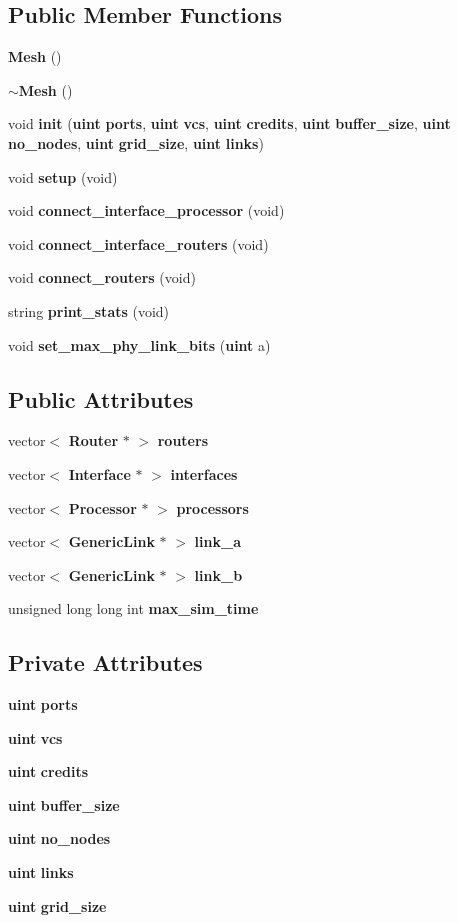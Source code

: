 \subsection*{Public Member Functions}
\begin{CompactItemize}
\item 
{\bf Mesh} ()
\item 
{\bf $\sim$Mesh} ()
\item 
void {\bf init} ({\bf uint} {\bf ports}, {\bf uint} {\bf vcs}, {\bf uint} {\bf credits}, {\bf uint} {\bf buffer\_\-size}, {\bf uint} {\bf no\_\-nodes}, {\bf uint} {\bf grid\_\-size}, {\bf uint} {\bf links})
\item 
void {\bf setup} (void)
\item 
void {\bf connect\_\-interface\_\-processor} (void)
\item 
void {\bf connect\_\-interface\_\-routers} (void)
\item 
void {\bf connect\_\-routers} (void)
\item 
string {\bf print\_\-stats} (void)
\item 
void {\bf set\_\-max\_\-phy\_\-link\_\-bits} ({\bf uint} a)
\end{CompactItemize}
\subsection*{Public Attributes}
\begin{CompactItemize}
\item 
vector$<$ {\bf Router} $\ast$ $>$ {\bf routers}
\item 
vector$<$ {\bf Interface} $\ast$ $>$ {\bf interfaces}
\item 
vector$<$ {\bf Processor} $\ast$ $>$ {\bf processors}
\item 
vector$<$ {\bf GenericLink} $\ast$ $>$ {\bf link\_\-a}
\item 
vector$<$ {\bf GenericLink} $\ast$ $>$ {\bf link\_\-b}
\item 
unsigned long long int {\bf max\_\-sim\_\-time}
\end{CompactItemize}
\subsection*{Private Attributes}
\begin{CompactItemize}
\item 
{\bf uint} {\bf ports}
\item 
{\bf uint} {\bf vcs}
\item 
{\bf uint} {\bf credits}
\item 
{\bf uint} {\bf buffer\_\-size}
\item 
{\bf uint} {\bf no\_\-nodes}
\item 
{\bf uint} {\bf links}
\item 
{\bf uint} {\bf grid\_\-size}
\end{CompactItemize}


